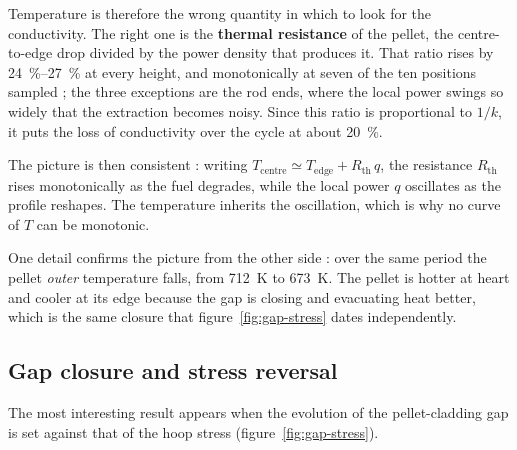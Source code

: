 Temperature is therefore the wrong quantity in which to look for the
conductivity. The right one is the \textbf{thermal resistance} of the pellet,
the centre-to-edge drop divided by the power density that produces it. That
ratio rises by \SIrange{24}{27}{\percent} at every height, and monotonically at
seven of the ten positions sampled ; the three exceptions are the rod ends,
where the local power swings so widely that the extraction becomes noisy. Since
this ratio is proportional to $1/k$, it puts the loss of conductivity over the
cycle at about \SI{20}{\percent}.

The picture is then consistent : writing
$T_{\text{centre}} \simeq T_{\text{edge}} + R_{\text{th}}\,q$, the resistance
$R_{\text{th}}$ rises monotonically as the fuel degrades, while the local power
$q$ oscillates as the profile reshapes. The temperature inherits the
oscillation, which is why no curve of $T$ can be monotonic.

One detail confirms the picture from the other side : over the same period the
pellet \emph{outer} temperature falls, from \SI{712}{\kelvin} to
\SI{673}{\kelvin}. The pellet is hotter at heart and cooler at its edge because
the gap is closing and evacuating heat better, which is the same closure that
figure~\ref{fig:gap-stress} dates independently.

\subsection{Gap closure and stress reversal}

The most interesting result appears when the evolution of the pellet-cladding
gap is set against that of the hoop stress (figure~\ref{fig:gap-stress}).

